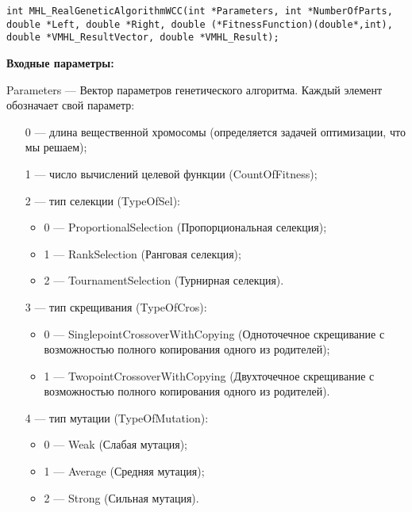 \documentclass[a4paper,12pt]{article}
\begin{document}
\begin{lstlisting}[label=code_syntax_MHL_RealGeneticAlgorithmWCC,caption=Синтаксис]
int MHL_RealGeneticAlgorithmWCC(int *Parameters, int *NumberOfParts, double *Left, double *Right, double (*FitnessFunction)(double*,int), double *VMHL_ResultVector, double *VMHL_Result);
\end{lstlisting}

\textbf{Входные параметры:}
 
Parameters --- Вектор параметров генетического алгоритма. Каждый элемент обозначает свой параметр:
 
 \begin{itemize}
 \item   [0] --- длина вещественной хромосомы (определяется задачей оптимизации, что мы решаем);
  \item   [1] --- число вычислений целевой функции (CountOfFitness);
  \item    [2] --- тип селекции (TypeOfSel):
 \begin{itemize}
       \item 0 --- ProportionalSelection (Пропорциональная селекция);
 
       \item 1 --- RankSelection (Ранговая селекция);
 
       \item 2 --- TournamentSelection (Турнирная селекция).
	    \end{itemize}
 
 \item [3] --- тип скрещивания (TypeOfCros):
  \begin{itemize}
       \item 0 --- SinglepointCrossoverWithCopying (Одноточечное скрещивание с возможностью полного копирования одного из родителей);
 
       \item 1 --- TwopointCrossoverWithCopying (Двухточечное скрещивание с возможностью полного копирования одного из родителей).
	    \end{itemize}
 
 \item [4] --- тип мутации (TypeOfMutation):
  \begin{itemize}
       \item 0 --- Weak (Слабая мутация);
 
       \item 1 --- Average (Средняя мутация);
 
       \item 2 --- Strong (Сильная мутация).
	    \end{itemize}
 

\end{itemize}
\end{document}
